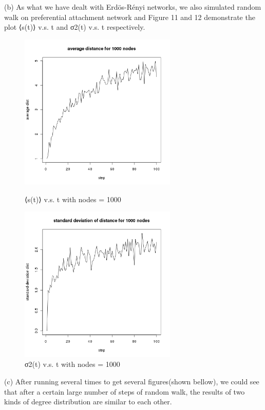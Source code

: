 \documentclass[draftcls,12pt,onecolumn]{IEEEtran}
\begin{document}
(b) As what we have dealt with Erdös-Rényi networks, we also simulated random walk on preferential attachment network and Figure 11 and 12 demonstrate the plot ⟨s(t)⟩ v.s. t and σ2(t) v.s. t respectively.
\begin{figure}[htbp]
\centering
\begin{minipage}[t]{0.48\textwidth}
\centering
\includegraphics[width=7.5cm]{2_2_b_distance.png}
\caption{⟨s(t)⟩ v.s. t with nodes = 1000}
\end{minipage}
\begin{minipage}[t]{0.48\textwidth}
\centering
\includegraphics[width=7.5cm]{2_2_b_deviation.png}
\caption{σ2(t) v.s. t with nodes = 1000}
\end{minipage}
\end{figure}
(c) After running several times to get several figures(shown bellow), we could see that after a certain large number of steps of random walk, the results of two kinds of degree distribution are similar to each other.
\end{document}
